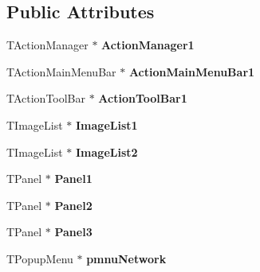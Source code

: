 \subsection*{Public Attributes}
\begin{DoxyCompactItemize}
\item 
\hypertarget{class_t_network_g_u_i_abdc95a48f6b4cc13fa72d39d85d62899}{T\+Action\+Manager $\ast$ {\bfseries Action\+Manager1}}\label{class_t_network_g_u_i_abdc95a48f6b4cc13fa72d39d85d62899}

\item 
\hypertarget{class_t_network_g_u_i_aebc2596d63e6d20e48deeccdd055e465}{T\+Action\+Main\+Menu\+Bar $\ast$ {\bfseries Action\+Main\+Menu\+Bar1}}\label{class_t_network_g_u_i_aebc2596d63e6d20e48deeccdd055e465}

\item 
\hypertarget{class_t_network_g_u_i_a0e91f1e4d5d0b1fb1459390c29159658}{T\+Action\+Tool\+Bar $\ast$ {\bfseries Action\+Tool\+Bar1}}\label{class_t_network_g_u_i_a0e91f1e4d5d0b1fb1459390c29159658}

\item 
\hypertarget{class_t_network_g_u_i_a4077aff685393ce61aee72dc353b3fe7}{T\+Image\+List $\ast$ {\bfseries Image\+List1}}\label{class_t_network_g_u_i_a4077aff685393ce61aee72dc353b3fe7}

\item 
\hypertarget{class_t_network_g_u_i_a608a03d14df65502a599b887a1626906}{T\+Image\+List $\ast$ {\bfseries Image\+List2}}\label{class_t_network_g_u_i_a608a03d14df65502a599b887a1626906}

\item 
\hypertarget{class_t_network_g_u_i_aca116a4f60cc788ea706b01ee517416b}{T\+Panel $\ast$ {\bfseries Panel1}}\label{class_t_network_g_u_i_aca116a4f60cc788ea706b01ee517416b}

\item 
\hypertarget{class_t_network_g_u_i_a142450d7f621a15d9c73b5e45c4e7915}{T\+Panel $\ast$ {\bfseries Panel2}}\label{class_t_network_g_u_i_a142450d7f621a15d9c73b5e45c4e7915}

\item 
\hypertarget{class_t_network_g_u_i_a8ff68f2827c87fd0c77c77cea7b7d135}{T\+Panel $\ast$ {\bfseries Panel3}}\label{class_t_network_g_u_i_a8ff68f2827c87fd0c77c77cea7b7d135}

\item 
\hypertarget{class_t_network_g_u_i_a7a98e38a3d80a4c558d75c1fc27246bd}{T\+Popup\+Menu $\ast$ {\bfseries pmnu\+Network}}\label{class_t_network_g_u_i_a7a98e38a3d80a4c558d75c1fc27246bd}


\end{DoxyCompactItemize}
